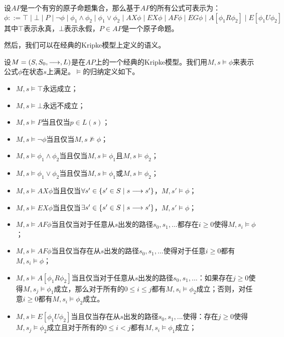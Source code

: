 \begin{definition}
	设$AP$是一个有穷的原子命题集合，那么基于$AP$的所有\CTL{}公式可表示为：
	$$\phi ::= \top\mid\bot\mid P\mid \neg\phi\mid \phi_1\wedge\phi_2\mid\phi_1\vee\phi_2\mid AX\phi\mid EX\phi\mid AF\phi\mid EG\phi\mid A[\phi_1 R \phi_2]\mid E[\phi_1 U \phi_2]$$
	其中$\top$表示永真，$\bot$表示永假，$P\in AP$是一个原子命题。
\end{definition}
然后，我们可以在经典的Kripke模型上定义\CTL{}的语义。
\begin{definition}
	设$M=(S,S_0,\longrightarrow,L)$是在$AP$上的一个经典的Kripke模型。我们用$M,s\models \phi$来表示\CTL{}公式$\phi$在状态$s$上满足。$\models$的归纳定义如下。
	\begin{itemize}
		\item $M,s\models \top$永远成立；
		\item $M,s\models \bot$永远不成立；
		\item $M,s\models P$当且仅当$p\in L(s)$；
		\item $M,s\models \neg\phi$当且仅当$M,s\not\models\phi$；
		\item $M,s\models \phi_1\wedge\phi_2$当且仅当$M,s\models\phi_1$且$M,s\models\phi_2$；
		\item $M,s\models \phi_1\vee\phi_2$当且仅当$M,s\models\phi_1$或$M,s\models\phi_2$；
		\item $M,s\models AX\phi$当且仅当$\forall s'\in \{s'\in S\mid s\longrightarrow s'\}$，$M,s'\models \phi$；
		\item $M,s\models EX\phi$当且仅当$\exists s'\in \{s'\in S\mid s\longrightarrow s'\}$，$M,s'\models \phi$；
		\item $M,s\models AF\phi$当且仅当对于任意从$s$出发的路径$s_0,s_1,...$都存在$i\ge 0$使得$M,s_i\models \phi$；
		\item $M,s\models AF\phi$当且仅当存在从$s$出发的路径$s_0,s_1,...$使得对于任意$i\ge 0$都有$M,s_i\models \phi$；
		\item $M,s\models A[\phi_1 R\phi_2]$当且仅当对于任意从$s$出发的路径$s_0,s_1,...$：如果存在$j\ge 0$使得$M,s_j\models\phi_1$成立，那么对于所有的$0\le i\le j$都有$M,s_i\models\phi_2$成立；否则，对任意$i\ge 0$都有$M,s_i\models\phi_2$成立。
		\item $M,s\models E[\phi_1 U\phi_2]$当且仅当存在从$s$出发的路径$s_0,s_1,...$使得：存在$j\ge 0$使得$M,s_j\models\phi_2$成立且对于所有的$0\le i< j$都有$M,s_i\models\phi_1$成立；
	\end{itemize}
\end{definition}

